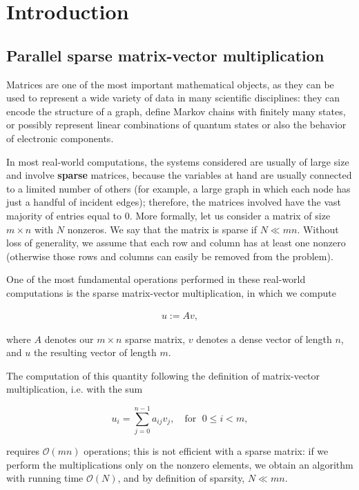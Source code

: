 \chapter{Introduction} \label{chap:introduction}
\section{Parallel sparse matrix-vector multiplication} \label{sec:par_matvec}
Matrices are one of the most important mathematical objects, as they can be used to represent a wide variety of data in many scientific disciplines: they can encode the structure of a graph, define Markov chains with finitely many states, or possibly represent linear combinations of quantum states or also the behavior of electronic components. 

In most real-world computations, the systems considered are usually of large size and involve \textbf{sparse} matrices, because the variables at hand are usually connected to a limited number of others (for example, a large graph in which each node has just a handful of incident edges); therefore, the matrices involved have the vast majority of entries equal to 0. More formally, let us consider a matrix of size $m \times n$ with $N$ nonzeros. We say that the matrix is sparse if $ N \ll mn $. Without loss of generality, we assume that each row and column has at least one nonzero (otherwise those rows and columns can easily be removed from the problem).

One of the most fundamental operations performed in these real-world computations is the sparse matrix-vector multiplication, in which we compute

\begin{align}
	u:=Av,
	\label{uAv}
\end{align}

where $A$ denotes our $m \times n$ sparse matrix, $v$ denotes a dense vector of length $n$, and $u$ the resulting vector of length $m$.

The computation of this quantity following the definition of matrix-vector multiplication, i.e. with the sum 

\[ 
	u_i = \sum_{j=0}^{n-1} a_{ij} v_j, \quad \text{for }\; 0 \leq i < m,
\]

requires $\mathcal{O}(mn)$ operations; this is not efficient with a sparse matrix: if we perform the multiplications only on the nonzero elements, we obtain an algorithm with running time $\mathcal{O}(N)$, and by definition of sparsity, $N \ll mn$.

